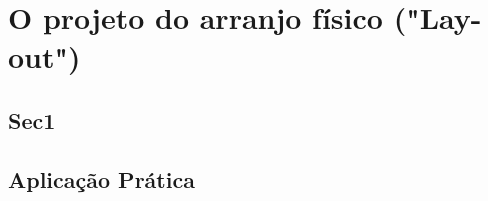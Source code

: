 \chapter{O projeto do arranjo físico ("Lay-out")} 
\label{chap:projeto_do_arranjo} 

\section{Sec1} 
\label{sec:projeto_do_arranjo_sec1} 
 
\section{Aplicação Prática} 
\label{sec:projeto_do_arranjo_aplicacao}